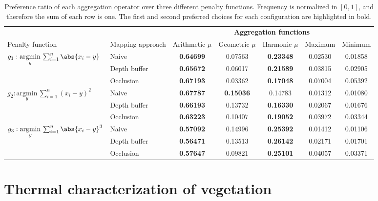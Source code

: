 \renewcommand{\arraystretch}{1.2}
\begin{table}
    \sffamily\small
    \centering
    \caption{Preference ratio of each aggregation operator over three different penalty functions. Frequency is normalized in $[0, 1]$, and therefore the sum of each row is one. The first and second preferred choices for each configuration are highlighted in bold. }
    \label{table:thermal_aggregation_frequency}
    \begin{tabular}{@{}llccccc@{} }
    \toprule
    & & \multicolumn{5}{c}{\textbf{Aggregation functions}} \\
    \cmidrule{3-7}
    Penalty function & Mapping approach & Arithmetic $\mu$ & Geometric $\mu$ & Harmonic $\mu$ & Maximum & Minimum\\
    \midrule
    \multirow{2}{*}{$g_1 : \underset{y}{\mathrm{argmin}}\, \sum_{i=1}^{n} \abs{x_i - y}$} & Naive & \textbf{0.64699} & 0.07563 & \textbf{0.23348} & 0.02530 & 0.01858 \\
    & Depth buffer & \textbf{0.65672} & 0.06017 & \textbf{0.21589} & 0.03815 & 0.02905 \\
    & Occlusion & \textbf{0.67193} & 0.03362 & \textbf{0.17048} & 0.07004 & 0.05392 \\
    \multirow{2}{*}{$g_2 : \underset{y}{\mathrm{argmin}}\, \sum_{i=1}^{n} (x_i - y)^2$} & Naive & \textbf{0.67787} & \textbf{0.15036} & 0.14783 & 0.01312 & 0.01080 \\
    & Depth buffer & \textbf{0.66193} & 0.13732 & \textbf{0.16330} & 0.02067 & 0.01676 \\
    & Occlusion & \textbf{0.63223} & 0.10407 & \textbf{0.19052} & 0.03972 & 0.03344 \\
    \multirow{2}{*}{$g_3 : \underset{y}{\mathrm{argmin}}\, \sum_{i=1}^{n} \abs{x_i - y}^3$} & Naive & \textbf{0.57092} & 0.14996 & \textbf{0.25392} & 0.01412 & 0.01106 \\
    & Depth buffer & \textbf{0.56471} & 0.13513 & \textbf{0.26142} & 0.02171 & 0.01701 \\
    & Occlusion & \textbf{0.57647} & 0.09821 & \textbf{0.25101} & 0.04057 & 0.03371 \\
    \bottomrule
    \end{tabular}
    \normalsize
\end{table}
\renewcommand{\arraystretch}{1}

\section{Thermal characterization of vegetation}

